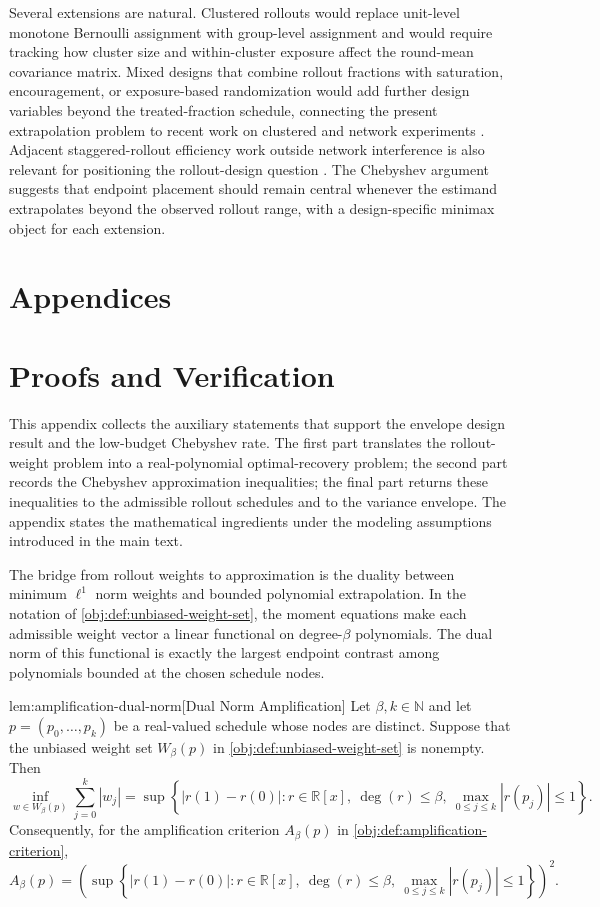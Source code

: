 \documentclass[11pt]{article}
\begin{document}
Several extensions are natural. Clustered rollouts would replace unit-level monotone Bernoulli assignment with group-level assignment and would require tracking how cluster size and within-cluster exposure affect the round-mean covariance matrix. Mixed designs that combine rollout fractions with saturation, encouragement, or exposure-based randomization would add further design variables beyond the treated-fraction schedule, connecting the present extrapolation problem to recent work on clustered and network experiments \citep{chen2025,fan2025,bhadra2025,schroder2026}. Adjacent staggered-rollout efficiency work outside network interference is also relevant for positioning the rollout-design question \citep{roth2021}. The Chebyshev argument suggests that endpoint placement should remain central whenever the estimand extrapolates beyond the observed rollout range, with a design-specific minimax object for each extension.


\appendix

\section*{Appendices}

\section{Proofs and Verification}

This appendix collects the auxiliary statements that support the envelope design result and the low-budget Chebyshev rate. The first part translates the rollout-weight problem into a real-polynomial optimal-recovery problem; the second part records the Chebyshev approximation inequalities; the final part returns these inequalities to the admissible rollout schedules and to the variance envelope. The appendix states the mathematical ingredients under the modeling assumptions introduced in the main text.

The bridge from rollout weights to approximation is the duality between minimum \(\ell^1\) norm weights and bounded polynomial extrapolation. In the notation of \cref{obj:def:unbiased-weight-set}, the moment equations make each admissible weight vector a linear functional on degree-\(\beta\) polynomials. The dual norm of this functional is exactly the largest endpoint contrast among polynomials bounded at the chosen schedule nodes.

\begin{lemmav}{lem:amplification-dual-norm}[Dual Norm Amplification]
Let \(\beta,k\in\mathbb N\) and let \(p=(p_0,\ldots,p_k)\) be a real-valued schedule whose nodes are distinct. Suppose that the unbiased weight set \(W_\beta(p)\) in \cref{obj:def:unbiased-weight-set} is nonempty. Then
\[
\inf_{w\in W_\beta(p)} \sum_{j=0}^k |w_j|
=
\sup\left\{
|r(1)-r(0)|:
r\in\mathbb R[x],\ \deg(r)\le \beta,\ \max_{0\le j\le k}|r(p_j)|\le 1
\right\}.
\]
Consequently, for the amplification criterion \(A_\beta(p)\) in \cref{obj:def:amplification-criterion},
\[
A_\beta(p)
=
\left(
\sup\left\{
|r(1)-r(0)|:
r\in\mathbb R[x],\ \deg(r)\le \beta,\ \max_{0\le j\le k}|r(p_j)|\le 1
\right\}
\right)^2 .
\]
\end{lemmav}
\end{document}
